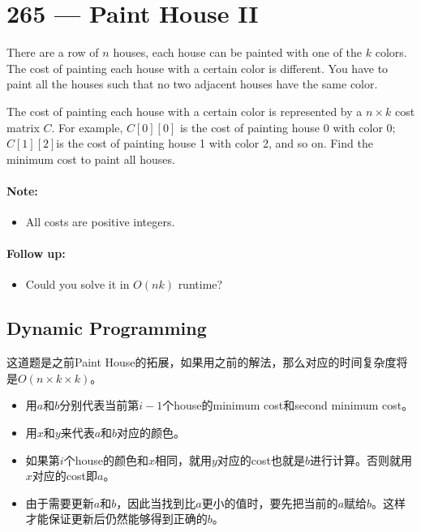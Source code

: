 \section{265 --- Paint House II}
There are a row of $n$ houses, each house can be painted with one of the $k$ colors. The cost of painting each house with a certain color is different. You have to paint all the houses such that no two adjacent houses have the same color.
\par
The cost of painting each house with a certain color is represented by a $n \times k$ cost matrix $C$. For example, $C[0][0]$ is the cost of painting house 0 with color 0; $C[1][2]$is the cost of painting house 1 with color 2, and so on. Find the minimum cost to paint all houses.

\paragraph{Note:}
\begin{itemize}
\item All costs are positive integers.
\end{itemize}

\paragraph{Follow up:}
\begin{itemize}
\item Could you solve it in $O(nk)$ runtime?
\end{itemize}
\subsection{Dynamic Programming}
这道题是之前Paint House的拓展，如果用之前的解法，那么对应的时间复杂度将是$O(n\times k\times k)$。
\begin{itemize}
\item 用$a$和$b$分别代表当前第$i-1$个house的minimum cost和second minimum cost。
\item 用$x$和$y$来代表$a$和$b$对应的颜色。
\item 如果第$i$个house的颜色和$x$相同，就用$y$对应的cost也就是$b$进行计算。否则就用$x$对应的cost即$a$。
\item 由于需要更新$a$和$b$，因此当找到比$a$更小的值时，要先把当前的$a$赋给$b$。这样才能保证更新后仍然能够得到正确的$b$。
\end{itemize}

